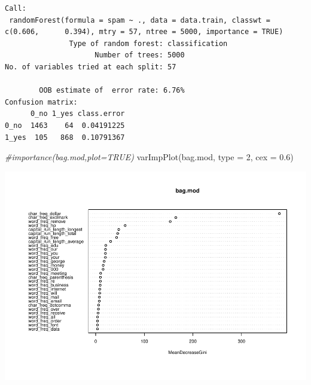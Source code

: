 \documentclass[
  11pt,
]{article}
\newenvironment{Shaded}{\begin{snugshade}}{\end{snugshade}}
\newcommand{\AttributeTok}[1]{\textcolor[rgb]{0.77,0.63,0.00}{#1}}
\newcommand{\CommentTok}[1]{\textcolor[rgb]{0.56,0.35,0.01}{\textit{#1}}}
\newcommand{\DecValTok}[1]{\textcolor[rgb]{0.00,0.00,0.81}{#1}}
\newcommand{\FloatTok}[1]{\textcolor[rgb]{0.00,0.00,0.81}{#1}}
\newcommand{\FunctionTok}[1]{\textcolor[rgb]{0.00,0.00,0.00}{#1}}
\newcommand{\NormalTok}[1]{#1}
\newcommand{\OtherTok}[1]{\textcolor[rgb]{0.56,0.35,0.01}{#1}}
\newcommand{\SpecialCharTok}[1]{\textcolor[rgb]{0.00,0.00,0.00}{#1}}
\begin{document}
\begin{verbatim}
Call:
 randomForest(formula = spam ~ ., data = data.train, classwt = c(0.606,      0.394), mtry = 57, ntree = 5000, importance = TRUE) 
               Type of random forest: classification
                     Number of trees: 5000
No. of variables tried at each split: 57

        OOB estimate of  error rate: 6.76%
Confusion matrix:
      0_no 1_yes class.error
0_no  1463    64  0.04191225
1_yes  105   868  0.10791367
\end{verbatim}

\begin{Shaded}
\begin{Highlighting}[]
\CommentTok{\#importance(bag.mod,plot=TRUE)}
\FunctionTok{varImpPlot}\NormalTok{(bag.mod, }\AttributeTok{type =} \DecValTok{2}\NormalTok{, }\AttributeTok{cex =} \FloatTok{0.6}\NormalTok{)}
\end{Highlighting}
\end{Shaded}

\includegraphics{report_files/figure-latex/Task_2_16-1.pdf}

\begin{Shaded}
\end{Shaded}
\end{document}
